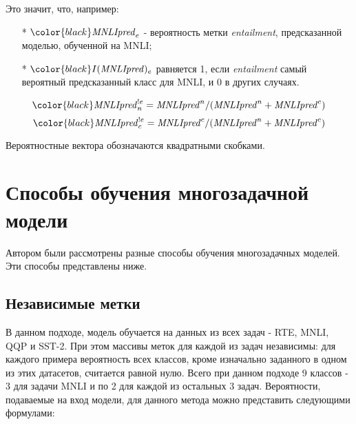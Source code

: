     Это значит, что, например:
    \begin{itemize}
    
    \item[*] $\color{black} \mathit{MNLIpred}_e$ - вероятность метки \textit{entailment}, предсказанной моделью, обученной на MNLI;
    
    \item[*] $\color{black} I(\mathit{MNLIpred})_e$ равняется 1, если \textit{entailment} самый вероятный предсказанный класс для MNLI, и 0 в других случаях. 
     \end{itemize}
   
         \begin{equation}
    \color{black} \mathit{MNLIpred}^{!e}_{n} = \mathit{MNLIpred}^n/(\mathit{MNLIpred}^n + \mathit{MNLIpred}^c) \label{eq:ps0:0}
    \end{equation}
             \begin{equation}
    \color{black} \mathit{MNLIpred}^{!e}_{c} = \mathit{MNLIpred}^c/(\mathit{MNLIpred}^n + \mathit{MNLIpred}^c) \label{eq:ps0:1}
    \end{equation}

    Вероятностные вектора обозначаются квадратными скобками.

\section{Способы обучения многозадачной модели}\label{subch:pseudolabel/sect3}

Автором были рассмотрены разные способы обучения многозадачных моделей. Эти способы представлены ниже.

    \subsection{Независимые метки}\label{subch:pseudolabel/sect3/sub1}

В данном подходе, модель обучается на данных из всех задач - RTE, MNLI, QQP и SST-2. При этом массивы меток для каждой из задач независимы: для каждого примера вероятность всех классов, кроме изначально заданного в одном из этих датасетов, считается равной нулю.  Всего при данном подходе 9 классов - 3 для задачи MNLI и по 2 для каждой из остальных 3 задач.   
Вероятности, подаваемые на вход модели, для данного метода можно представить следующими формулами:


